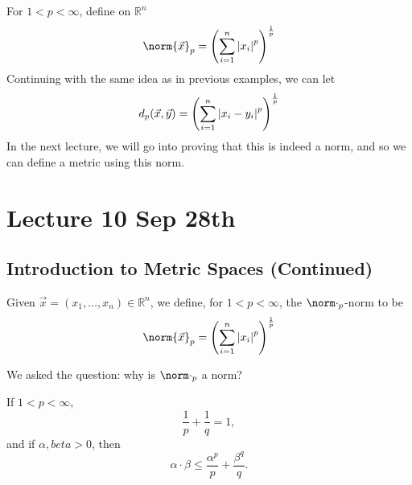 \documentclass[notoc,notitlepage]{tufte-book}
\begin{document}
\begin{eg}
  For $1 < p < \infty$, define on $\mathbb{R}^n$
  \begin{equation*}
    \norm{\vec{x}}_p = \left( \sum_{i=1}^{n} \abs{x_i}^p \right)^\frac{1}{p}
  \end{equation*}
  Continuing with the same idea as in previous examples, we can let
  \begin{equation*}
    d_p(\vec{x}, \vec{y}) = \left( \sum_{i=1}^{n} \left|x_i - y_i\right|^p \right)^\frac{1}{p}
  \end{equation*}
  In the next lecture, we will go into proving that this is indeed a norm, and so we can define a metric using this norm.
\end{eg}



\chapter{Lecture 10 Sep 28th}%
\label{chp:lecture_10_sep_28th}

\section{Introduction to Metric Spaces (Continued)}%
\label{sec:introduction_to_metric_spaces_continued}

\begin{defn}\label{defn:p_norm}
  Given $\vec{x} = ( x_1, \ldots, x_n ) \in \mathbb{R}^n$, we define, for $1 < p < \infty$, the $\norm\cdot_p$-norm to be
  \begin{equation*}
    \norm{\vec{x}}_p = \left( \sum_{i=1}^{n} \abs{x_i}^p \right)^{\frac{1}{p}}
  \end{equation*}
\end{defn}

We asked the question: why is $\norm\cdot_p$ a norm?

\begin{lemma}\label{lemma:young_s_inequality}
  If $1 < p < \infty$,
  \begin{equation*}
    \frac{1}{p} + \frac{1}{q} = 1,
  \end{equation*}
  and if $\alpha, beta > 0$, then
  \begin{equation*}
    \alpha \cdot \beta \leq \frac{\alpha^p}{p} + \frac{\beta^q}{q}.
  \end{equation*}
\end{lemma}
\end{document}
